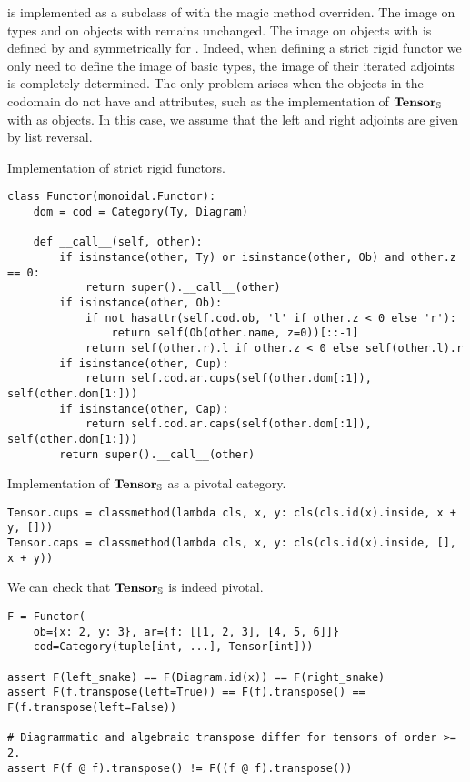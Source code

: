  is implemented as a subclass of  with the magic method  overriden.
The image on types and on objects  with  remains unchanged.
The image on objects  with  is defined by  and symmetrically for .
Indeed, when defining a strict rigid functor we only need to define the image of basic types, the image of their iterated adjoints is completely determined.
The only problem arises when the objects in the codomain do not have  and  attributes, such as the implementation of $\mathbf{Tensor}_\S$ with  as objects.
In this case, we assume that the left and right adjoints are given by list reversal.

\begin{python}
{\normalfont Implementation of strict rigid functors.}
\begin{verbatim}
class Functor(monoidal.Functor):
    dom = cod = Category(Ty, Diagram)

    def __call__(self, other):
        if isinstance(other, Ty) or isinstance(other, Ob) and other.z == 0:
            return super().__call__(other)
        if isinstance(other, Ob):
            if not hasattr(self.cod.ob, 'l' if other.z < 0 else 'r'):
                return self(Ob(other.name, z=0))[::-1]
            return self(other.r).l if other.z < 0 else self(other.l).r
        if isinstance(other, Cup):
            return self.cod.ar.cups(self(other.dom[:1]), self(other.dom[1:]))
        if isinstance(other, Cap):
            return self.cod.ar.caps(self(other.dom[:1]), self(other.dom[1:]))
        return super().__call__(other)
\end{verbatim}
\end{python}

\begin{python}
{\normalfont Implementation of $\mathbf{Tensor}_\S$ as a pivotal category.}
\begin{verbatim}
Tensor.cups = classmethod(lambda cls, x, y: cls(cls.id(x).inside, x + y, []))
Tensor.caps = classmethod(lambda cls, x, y: cls(cls.id(x).inside, [], x + y))
\end{verbatim}
\end{python}

\begin{example}
We can check that $\mathbf{Tensor}_\S$ is indeed pivotal.

\begin{verbatim}
F = Functor(
    ob={x: 2, y: 3}, ar={f: [[1, 2, 3], [4, 5, 6]]}
    cod=Category(tuple[int, ...], Tensor[int]))

assert F(left_snake) == F(Diagram.id(x)) == F(right_snake)
assert F(f.transpose(left=True)) == F(f).transpose() == F(f.transpose(left=False))

# Diagrammatic and algebraic transpose differ for tensors of order >= 2.
assert F(f @ f).transpose() != F((f @ f).transpose())
\end{verbatim}
\end{example}

